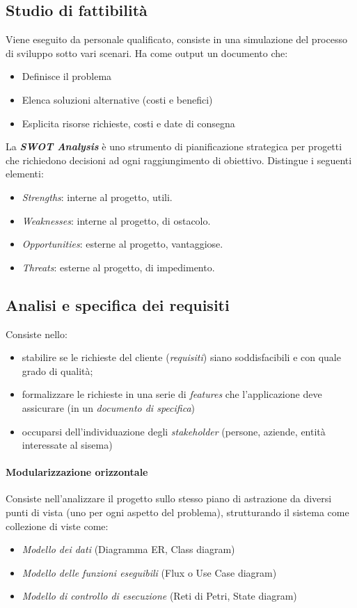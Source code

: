 \subsection{Studio di fattibilità}
Viene eseguito da personale qualificato, consiste in una simulazione del processo di sviluppo sotto vari scenari. Ha come output un documento che:
\begin{itemize}
    \item Definisce il problema
    \item Elenca soluzioni alternative (costi e benefici)
    \item Esplicita risorse richieste, costi e date di consegna
\end{itemize}
La \textit{\textbf{SWOT Analysis}} è uno strumento di pianificazione strategica per progetti che richiedono decisioni ad ogni raggiungimento di obiettivo. Distingue i seguenti elementi:
\begin{itemize}
    \item \textit{Strengths}: interne al progetto, utili.
    \item \textit{Weaknesses}: interne al progetto, di ostacolo.
    \item \textit{Opportunities}: esterne al progetto, vantaggiose.
    \item \textit{Threats}: esterne al progetto, di impedimento.
\end{itemize}

\subsection{Analisi e specifica dei requisiti}
Consiste nello:
\begin{itemize}
    \item stabilire se le richieste del cliente (\textit{requisiti}) siano soddisfacibili e con quale grado di qualità;
    \item formalizzare le richieste in una serie di \textit{features} che l'applicazione deve assicurare (in un \textit{documento di specifica})
    \item occuparsi dell'individuazione degli \textit{stakeholder} (persone, aziende, entità interessate al sisema)
\end{itemize}

\paragraph{Modularizzazione orizzontale} Consiste nell'analizzare il progetto sullo stesso piano di astrazione da diversi punti di vista (uno per ogni aspetto del problema), strutturando il sistema come collezione di viste come:
\begin{itemize}
    \item \textit{Modello dei dati} (Diagramma ER, Class diagram)
    \item \textit{Modello delle funzioni eseguibili} (Flux o Use Case diagram)
    \item \textit{Modello di controllo di esecuzione} (Reti di Petri, State diagram)
\end{itemize}

